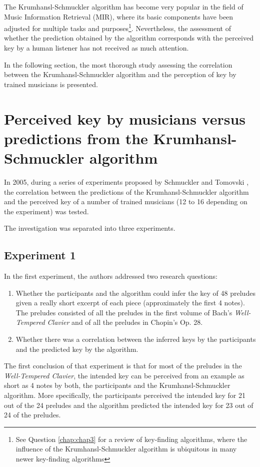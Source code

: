The Krumhansl-Schmuckler algorithm has become very popular in the field of Music Information Retrieval (MIR), where its basic components have been adjusted for multiple tasks and purposes\footnote{See Question \ref{chap:chap3} for a review of key-finding algorithms, where the influence of the Krumhansl-Schmuckler algorithm is ubiquitous in many newer key-finding algorithms}. Nevertheless, the assessment of whether the prediction obtained by the algorithm corresponds with the perceived key by a human listener has not received as much attention. 

In the following section, the most thorough study assessing the correlation between the Krumhansl-Schmuckler algorithm and the perception of key by trained musicians is presented.

\section{Perceived key by musicians versus predictions from the Krumhansl-Schmuckler algorithm}

In 2005, during a series of experiments proposed by Schmuckler and Tomovski \cite{schmuckler2005perceptual}, the correlation between the predictions of the Krumhansl-Schmuckler algorithm and the perceived key of a number of trained musicians (12 to 16 depending on the experiment) was tested.

The investigation was separated into three experiments.

\subsection{Experiment 1}

In the first experiment, the authors addressed two research questions: 
\begin{enumerate}
    \item Whether the participants and the algorithm could infer the key of 48 preludes given a really short excerpt of each piece (approximately the first 4 notes). The preludes consisted of all the preludes in the first volume of Bach's \emph{Well-Tempered Clavier} and of all the preludes in Chopin's Op. 28.
    \item Whether there was a correlation between the inferred keys by the participants and the predicted key by the algorithm.
\end{enumerate} 

The first conclusion of that experiment is that for most of the preludes in the \emph{Well-Tempered Clavier}, the intended key can be perceived from an example as short as 4 notes by both, the participants and the Krumhansl-Schmuckler algorithm. More specifically, the participants perceived the intended key for 21 out of the 24 preludes and the algorithm predicted the intended key for 23 out of 24 of the preludes.

